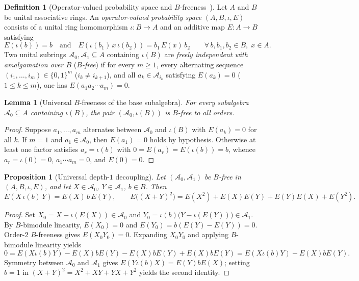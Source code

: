 \documentclass[11pt,a4paper]{article}
\newtheorem{proposition}[theorem]{Proposition}
\newtheorem{lemma}[theorem]{Lemma}
\theoremstyle{definition}
\newtheorem{definition}[theorem]{Definition}
\begin{document}
\begin{definition}[Operator-valued probability space and $B$-freeness~\cite{Voiculescu1995,Speicher1998}]
Let $A$ and $B$ be unital associative rings. An \emph{operator-valued probability space} $(A, B, \iota, E)$ consists of a unital ring homomorphism $\iota \colon B \to A$ and an additive map $E \colon A \to B$ satisfying
\[
E(\iota(b)) = b \quad\text{and}\quad E(\iota(b_1)\, x\, \iota(b_2)) = b_1\, E(x)\, b_2 \qquad \forall\, b, b_1, b_2 \in B,\; x \in A.
\]
Two unital subrings $\mathcal{A}_0, \mathcal{A}_1 \subseteq A$ containing $\iota(B)$ are \emph{freely independent with amalgamation over $B$} (\emph{$B$-free}) if for every $m \ge 1$, every alternating sequence $(i_1, \dots, i_m) \in \{0, 1\}^m$ ($i_k \neq i_{k+1}$), and all $a_k \in \mathcal{A}_{i_k}$ satisfying $E(a_k) = 0$ ($1 \le k \le m$), one has $E(a_1 a_2 \cdots a_m) = 0$.
\end{definition}

\begin{lemma}[Universal $B$-freeness of the base subalgebra]\label{lem:iota-free}
For every subalgebra $\mathcal{A}_0 \subseteq A$ containing $\iota(B)$, the pair $(\mathcal{A}_0, \iota(B))$ is $B$-free to all orders.
\end{lemma}
\begin{proof}
Suppose $a_1, \dots, a_m$ alternates between $\mathcal{A}_0$ and $\iota(B)$ with $E(a_k) = 0$ for all $k$. If $m = 1$ and $a_1 \in \mathcal{A}_0$, then $E(a_1) = 0$ holds by hypothesis. Otherwise at least one factor satisfies $a_r = \iota(b)$ with $0 = E(a_r) = E(\iota(b)) = b$, whence $a_r = \iota(0) = 0$, $a_1 \cdots a_m = 0$, and $E(0) = 0$.
\end{proof}

\begin{proposition}[Universal depth-$1$ decoupling]\label{prop:deg2}
Let $(\mathcal{A}_0, \mathcal{A}_1)$ be $B$-free in $(A, B, \iota, E)$, and let $X \in \mathcal{A}_0$, $Y \in \mathcal{A}_1$, $b \in B$. Then
\[
E(X\, \iota(b)\, Y) = E(X)\, b\, E(Y), \qquad
E\bigl((X + Y)^2\bigr) = E(X^2) + E(X)E(Y) + E(Y)E(X) + E(Y^2).
\]
\end{proposition}
\begin{proof}
Set $X_0 = X - \iota(E(X)) \in \mathcal{A}_0$ and $Y_0 = \iota(b)\bigl(Y - \iota(E(Y))\bigr) \in \mathcal{A}_1$. By $B$-bimodule linearity, $E(X_0) = 0$ and $E(Y_0) = b(E(Y) - E(Y)) = 0$. Order-$2$ $B$-freeness gives $E(X_0 Y_0) = 0$. Expanding $X_0 Y_0$ and applying $B$-bimodule linearity yields
\[
0 = E(X \iota(b) Y) - E(X) b E(Y) - E(X) b E(Y) + E(X) b E(Y) = E(X \iota(b) Y) - E(X) b E(Y).
\]
Symmetry between $\mathcal{A}_0$ and $\mathcal{A}_1$ gives $E(Y \iota(b) X) = E(Y) b E(X)$; setting $b = 1$ in $(X + Y)^2 = X^2 + XY + YX + Y^2$ yields the second identity.
\end{proof}
\end{document}

